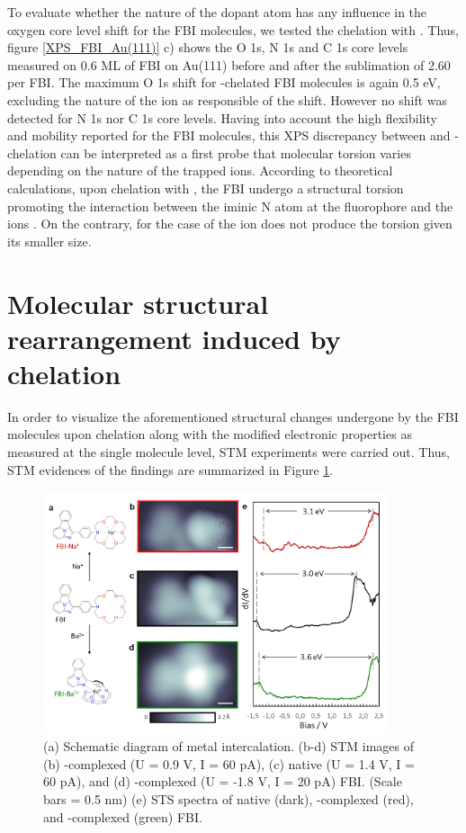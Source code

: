 \documentclass[aps,prl,reprint,longbibliography,superscriptaddress, english]{revtex4-1}
\begin{document}
To evaluate whether the nature of the dopant atom has any influence in the oxygen core level shift for the FBI molecules, we tested the chelation with \Nap. Thus, figure \ref{XPS_FBI_Au(111)} c) shows the O 1s, N 1s and C 1s core levels measured on 0.6 ML of FBI on Au(111) before and after the sublimation of 2.60 \Nap per FBI. The maximum O 1s shift for \Nap-chelated FBI molecules is again 0.5 eV, excluding the nature of the ion as responsible of the shift. However no shift was detected for N 1s nor C 1s core levels. Having into account the high flexibility and mobility reported for the FBI molecules, this XPS discrepancy between \Bapp\- and \Nap-chelation can be interpreted as a first probe that molecular torsion varies depending on the nature of the trapped ions. According to theoretical calculations, upon chelation with \Bapp, the FBI undergo a structural torsion promoting the interaction between the iminic N atom at the fluorophore and the ions \cite{rivilla_fluorescent_2020}. On the contrary, for the case of \Nap the ion does not produce the torsion given its smaller size. 




\section{Molecular structural rearrangement induced by chelation}

In order to visualize the aforementioned structural changes undergone by the FBI molecules upon chelation along with the modified electronic properties as measured at the single molecule level, STM experiments were carried out. Thus, STM evidences of the findings are summarized in Figure \ref{Fig_STS}. 

\begin{figure}[ht!]
	\includegraphics[width=0.9\textwidth]{figures/Fig_STS.png}
	\caption{\label{Fig_STS} 
    (a) Schematic diagram of metal intercalation. (b-d) STM images of (b) \Nap-complexed (U = 0.9 V, I = 60 pA), (c) native (U = 1.4 V, I = 60 pA), and (d) \Bapp-complexed (U = -1.8 V, I = 20 pA) FBI. (Scale bars = 0.5 nm) (e) STS spectra of native (dark), \Nap-complexed (red), and \Bapp-complexed (green) FBI.}
\end{figure}
\end{document}
